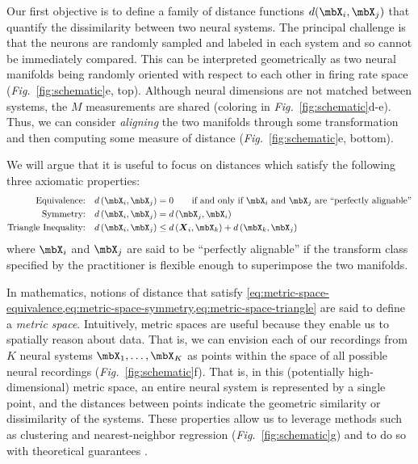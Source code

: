 Our first objective is to define a family of distance functions $d(\mbX_i, \mbX_j)$ that quantify the dissimilarity between two neural systems.
The principal challenge is that the neurons are randomly sampled and labeled in each system and so cannot be immediately compared.
This can be interpreted geometrically as two neural manifolds being randomly oriented with respect to each other in firing rate space (\textit{Fig.}~\ref{fig:schematic}e, top).
Although neural dimensions are not matched between systems, the $M$ measurements are shared (coloring in \textit{Fig.}~\ref{fig:schematic}d-e).
Thus, we can consider \textit{aligning} the two manifolds through some transformation and then computing some measure of distance (\textit{Fig.}~\ref{fig:schematic}e, bottom). 

We will argue that it is useful to focus on distances which satisfy the following three axiomatic properties:
\begin{align}
\label{eq:metric-space-equivalence}
\text{Equivalence:} & \quad d\left(\mbX_i, \mbX_j\right)=0 \qquad \text{if and only if $\mbX_i$ and $\mbX_j$ are ``perfectly alignable''}\\
\label{eq:metric-space-symmetry}
\text{Symmetry:} & \quad d\left(\mbX_i, \mbX_j \right) =d\left(\mbX_j, \mbX_i \right)\\
\label{eq:metric-space-triangle}
\text{Triangle Inequality:} & \quad d\left(\mbX_i, \mbX_j \right) \leq d\left(\boldsymbol{X}_i, \mbX_k \right) + d\left(\mbX_k, \mbX_j \right)
\end{align}
where $\mbX_i$ and $\mbX_j$ are said to be ``perfectly alignable'' if the transform class specified by the practitioner is flexible enough to superimpose the two manifolds.

In mathematics, notions of distance that satisfy \cref{eq:metric-space-equivalence,eq:metric-space-symmetry,eq:metric-space-triangle} are said to define a \textit{metric space}.
Intuitively, metric spaces are useful because they enable us to spatially reason about data.
That is, we can envision each of our recordings from $K$ neural systems $\mbX_1, \dots, \mbX_K$ as points within the space of all possible neural recordings (\textit{Fig.}~\ref{fig:schematic}f).
That is, in this (potentially high-dimensional) metric space, an entire neural system is represented by a single point, and the distances between points indicate the geometric similarity or dissimilarity of the systems.   
These properties allow us to leverage methods such as clustering and nearest-neighbor regression (\textit{Fig.}~\ref{fig:schematic}g) and to do so with theoretical guarantees \parencite[see e.g.][]{Cover1967,Dasgupta2005}.

